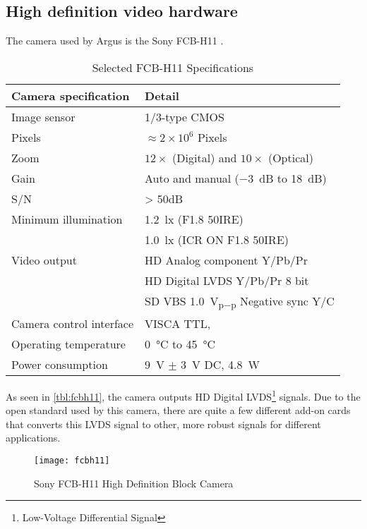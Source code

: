\subsection{High definition video hardware}
The camera used by Argus is the Sony FCB-H11 \citet{fcbh11}. 
\begin{center}
	\begin{table}[htbp]
		\begin{tabular}{ll}
		
			\toprule
				Camera specification & Detail \\
			\midrule
				Image sensor 			& 1/3-type CMOS \\
				Pixels 					& $\approx2\times10^{6}$ Pixels \\
				Zoom 					& $12\times$ (Digital) and $10\times$ (Optical) \\
				Gain 					& Auto and manual (\SI{-3}{\deci\bel} to \SI{18}{\deci\bel}) \\
				S/N						& > 50dB \\
				Minimum illumination 	& \SI{1.2}{\lux} (F1.8 50IRE) \\
										& \SI{1.0}{\lux} (ICR ON F1.8 50IRE) \\
				Video output			& HD Analog component Y/Pb/Pr \\
										& HD Digital LVDS Y/Pb/Pr 8 bit \\
										& SD VBS \SI{1.0}{\volt_{p-p}} Negative sync Y/C \\
				Camera control interface& VISCA TTL,\\
				Operating temperature	& \SI{0}{\celsius} to \SI{45}{\celsius} \\
				Power consumption		& \SI{9}{\volt} $\pm$ \SI{3}{\volt} DC, \SI{4.8}{\watt} \\
			\bottomrule
		\end{tabular}
		\caption{Selected FCB-H11 Specifications}
		\label{tbl:fcbh11}
	\end{table}
\end{center}

As seen in \vref{tbl:fcbh11}, the camera outputs HD Digital LVDS\footnote{Low-Voltage Differential Signal} signals.
Due to the open standard used by this camera, there are quite a few different add-on cards that 
converts this LVDS signal to other, more robust signals for different applications.


\begin{figure}[htbp]
	\centering
	\texttt{[image: fcbh11]}
	\caption{Sony FCB-H11 High Definition Block Camera}
	\label{fig:fcb-h11}
\end{figure}

